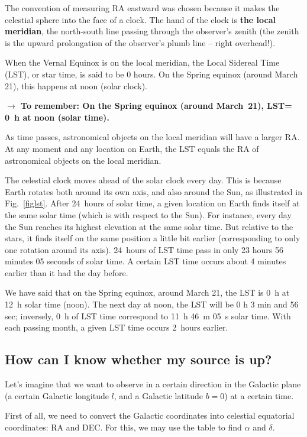 The convention of measuring RA eastward was chosen
because it makes the celestial sphere into the face of a clock. 
The hand of the clock is {\bf the local meridian}, 
the north-south line passing through the observer's zenith 
(the zenith is the upward prolongation of the observer's plumb line --
right overhead!). 

When the Vernal Equinox is on the local meridian, the Local Sidereal
Time (LST), or star time, is said to be 0 hours. 
On the Spring equinox (around March 21), this happens at noon (solar clock). 

{\bf$\rightarrow$ To remember: On the Spring equinox (around March~21), LST= 0~h at noon (solar time).}

As time passes, 
astronomical objects on the local meridian will have a larger RA.
At any moment and any location on Earth, 
the LST equals the RA of astronomical objects on the
local meridian. 

The celestial clock moves ahead of the solar clock every day. This 
is because Earth rotates both around its own axis, and also around the
Sun, as illustrated in Fig.~\ref{figlst}. 
After 24~hours of solar time, a given location on Earth 
finds itself at the same solar time (which is with respect to the Sun). 
For instance, every day the Sun reaches its highest elevation at the same 
solar time. 
But relative to the stars, it finds itself on 
the same position a little bit earlier (corresponding
to only one rotation around its axis). 24~hours of LST time
pass in only 
23 hours 56 minutes 05 seconds of solar time. A certain LST time
occurs about 4 minutes earlier than it had the day before. 

We have said that on the Spring equinox, around March 21, the LST is 0~h
at 12~h solar time (noon). The next day at noon, 
the LST will be 0 h 3 min and 56 sec; inversely, 0~h of LST time
correspond to 11~h 46~m 05~s solar time. 
With each passing month, a given LST time occurs 2~hours earlier. 

\subsection{How can I know whether my source is up?}
\label{app:visiblecoords}

Let's imagine that we want to observe in a certain direction in the
Galactic plane (a certain Galactic longitude $l$, and a Galactic 
latitude $b=0$) at a certain time. 

First of all, we need to convert the Galactic coordinates into 
celestial equatorial coordinates: RA and DEC. For this, we may use
the table to find $\alpha$ and $\delta$. 

